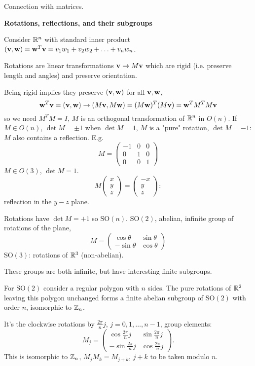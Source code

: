 \documentclass[10pt, a4paper]{article}
\begin{document}
Connection with matrices.

\textbf{Rotations,
reflections,
and their subgroups}

Consider $\mathbb{R} ^ n$ with standard inner product $(\mathbf{v}, \mathbf{w}) = \mathbf{w} ^ T\mathbf{v} = v_1w_1 + v_2w_2 + \dotsc + v_nw_n$.

Rotations are linear transformations $\mathbf{v} \to M\mathbf{v}$ which are rigid
(i.e. preserve length and angles)
and preserve orientation.

Being rigid implies they preserve $(\mathbf{v}, \mathbf{w})$ for all $\mathbf{v}, \mathbf{w}$,
\[
\mathbf{w} ^ T\mathbf{v} = (\mathbf{v}, \mathbf{w}) \to (M\mathbf{v}, M\mathbf{w}) = (M\mathbf{w}) ^ T(M\mathbf{v}) = \mathbf{w} ^ TM ^ TM\mathbf{v}
\]
so we need $M ^ TM = I$,
$M$ is an orthogonal transformation of $\mathbb{R} ^ n$ in $O(n)$.
If $M \in O(n)$,
$\det{M} = \pm 1$ when $\det{M} = 1$,
$M$ is a "pure" rotation,
$\det{M} = -1$:
$M$ also contains a reflection.
E.g.
\[
M = \begin{pmatrix}
    -1 & 0 & 0 \\ 0 & 1 & 0 \\ 0 & 0 & 1
\end{pmatrix}
\]
$M \in O(3)$,
$\det{M} = 1$.
\[
M\begin{pmatrix}
    x \\ y \\ z
\end{pmatrix} = \begin{pmatrix}
    -x \\ y \\ z
\end{pmatrix}:
\]
reflection in the $y-z$ plane.

Rotations have $\det{M} = +1$ so $\mathrm{SO}(n)$.
$\mathrm{SO}(2)$,
abelian,
infinite group of rotations of the plane,
\[
M = \begin{pmatrix}
    \cos{\theta} & \sin{\theta} \\
    -\sin{\theta} & \cos{\theta}
\end{pmatrix}
\]
$\mathrm{SO}(3)$:
rotations of $\mathbb{R} ^ 3$
(non-abelian).

These groups are both infinite,
but have interesting finite subgroups.

For $\mathrm{SO}(2)$ consider a regular polygon with $n$ sides.
The pure rotations of $\mathbb{R} ^ 2$ leaving this polygon unchanged forms a finite abelian subgroup of $\mathrm{SO}(2)$ with order $n$,
isomorphic to $\mathbb{Z}_n$.

It's the clockwise rotations by $\frac{2\pi}{n}j$,
$j = 0, 1, \dotsc, n - 1$,
group elements:
\[
M_j = \begin{pmatrix}
    \cos{\frac{2\pi}{n}j} & \sin{\frac{2\pi}{n}j} \\
    -\sin{\frac{2\pi}{n}j} & \cos{\frac{2\pi}{n}j}
\end{pmatrix}.
\]
This is isomorphic to $\mathbb{Z}_n$,
$M_jM_k = M_{j + k}$,
$j + k$ to be taken modulo $n$.
\end{document}
